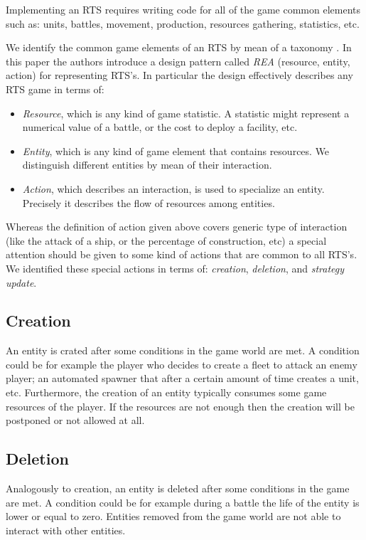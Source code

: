 Implementing an RTS requires writing code for all of the game common elements such as: units, battles, movement, production, resources gathering, statistics, etc.

We identify the common game elements of an RTS by mean of a taxonomy \cite{abbadi2014resource}. In this paper the authors introduce a design pattern called \textit{REA} (resource, entity, action) for representing RTS's. In particular the design effectively describes any RTS game in terms of:
\begin{itemize}[noitemsep,nolistsep]
\item \textit{Resource}, which is any kind of game statistic. A statistic might represent a numerical value of a battle, or the cost to deploy a facility, etc.
\item \textit{Entity}, which is any kind of game element that contains resources. We distinguish different entities by mean of their interaction.
\item \textit{Action}, which describes an interaction, is used to specialize an entity. Precisely it describes the flow of resources among entities.
\end{itemize}


Whereas the definition of action given above covers generic type of interaction (like the attack of a ship, or the percentage of construction, etc) a special attention should be given to some kind of actions that are common to all RTS's. We identified these special actions in terms of: \textit{creation}, \textit{deletion}, and \textit{strategy update}.

\subsection*{Creation}
An entity is crated after some conditions in the game world are met. A condition could be for example the player who decides to create a fleet to attack an enemy player; an automated spawner that after a certain amount of time creates a unit, etc. Furthermore, the creation of an entity typically consumes some game resources of the player. If the resources are not enough then the creation will be postponed or not allowed at all. 

\subsection*{Deletion}
Analogously to creation, an entity is deleted after some conditions in the game are met. A condition could be for example during a battle the life of the entity is lower or equal to zero. Entities removed from the game world are not able to interact with other entities.

